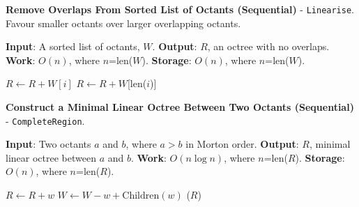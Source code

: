 \begin{algorithm}
    \caption{\textbf{Remove Overlaps From Sorted List of Octants (Sequential)} - \texttt{Linearise}. Favour smaller octants over larger overlapping octants.}
    \label{alg:app:morton:linearise_octree}
    \begin{algorithmic}

        \STATE \textbf{Input}: A sorted list of octants, $W$.
        \STATE \textbf{Output}: $R$, an octree with no overlaps.
        \STATE \textbf{Work}: $O(n)$, where $n$=len($W$).
        \STATE \textbf{Storage}: $O(n)$, where $n$=len($W$).

                \STATE $R \gets R + W[i]$
            \ENDIF
        \ENDFOR
        \STATE $R\gets R+W$[len($i$)]
    \end{algorithmic}
\end{algorithm}


\begin{algorithm}
    \caption{\textbf{Construct a Minimal Linear Octree Between Two Octants (Sequential)} - \texttt{CompleteRegion}.}
    \label{alg:app:morton:complete_region}
    \begin{algorithmic}
        \STATE \textbf{Input}: Two octants $a$ and $b$, where $a > b$ in Morton order.
        \STATE \textbf{Output}: $R$, minimal linear octree between $a$ and $b$.
        \STATE \textbf{Work}: $O(n \log n)$, where $n$=len($R$).
        \STATE \textbf{Storage}: $O(n)$, where $n$=len($R$).

                \STATE $R \gets R + w$
                \STATE $W \gets W - w + \text{Children}(w)$
            \ENDIF
        \ENDFOR
        \STATE {}($R$)
    \end{algorithmic}
\end{algorithm}

